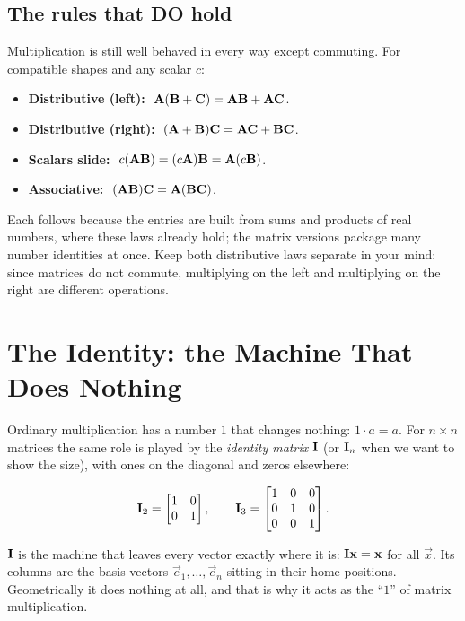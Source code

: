 \subsection{The rules that DO hold}

Multiplication is still well behaved in every way except commuting. For compatible
shapes and any scalar $c$:

\begin{itemize}
\item \textbf{Distributive (left):} $\ \mathbf{A}(\mathbf{B}+\mathbf{C}) = \mathbf{A}\mathbf{B} + \mathbf{A}\mathbf{C}$.
\item \textbf{Distributive (right):} $\ (\mathbf{A}+\mathbf{B})\mathbf{C} = \mathbf{A}\mathbf{C} + \mathbf{B}\mathbf{C}$.
\item \textbf{Scalars slide:} $\ c(\mat{A}\mat{B}) = (c\mat{A})\mat{B} = \mat{A}(c\mat{B})$.
\item \textbf{Associative:} $\ (\mat{A}\mat{B})\mat{C} = \mat{A}(\mat{B}\mat{C})$.
\end{itemize}

Each follows because the entries are built from sums and products of real numbers, where
these laws already hold; the matrix versions package many number identities at once.
Keep both distributive laws separate in your mind: since matrices do not commute,
multiplying on the left and multiplying on the right are different operations.

\section{The Identity: the Machine That Does Nothing}
\label{ch08:identity}

Ordinary multiplication has a number $1$ that changes nothing: $1\cdot a = a$. For
$n\times n$ matrices the same role is played by the \emph{identity matrix} $\mathbf{I}$
(or $\mathbf{I}_n$ when we want to show the size), with ones on the diagonal and zeros
elsewhere:

\[
\mathbf{I}_2 = \begin{bmatrix} 1 & 0 \\ 0 & 1 \end{bmatrix},
\qquad
\mathbf{I}_3 = \begin{bmatrix} 1 & 0 & 0 \\ 0 & 1 & 0 \\ 0 & 0 & 1 \end{bmatrix}.
\]

\begin{intuitionbox}
$\mathbf{I}$ is the machine that leaves every vector exactly where it is: $\mathbf{I}\mathbf{x} = \mathbf{x}$ for all $\vec{x}$. Its columns are the basis vectors $\vec{e}_1,\dots,\vec{e}_n$
sitting in their home positions. Geometrically it does nothing at all, and that is
why it acts as the ``$1$'' of matrix multiplication.
\end{intuitionbox}

